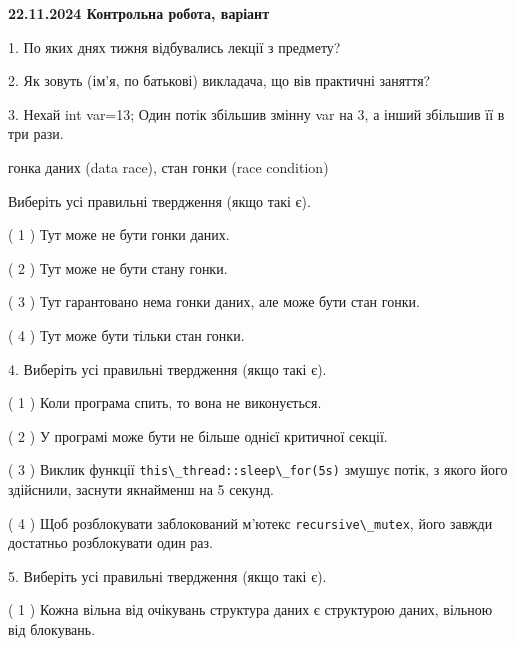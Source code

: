 \documentclass[12pt, ukrainian]{article}
\def\code#1{\Verb!#1!}
\begin{document}
\vspace{4mm}
\newpage
\begin {large}

\textbf{22.11.2024 Контрольна робота, варіант  }\par


{
1. По яких днях тижня відбувались лекції з предмету?



\vspace{5mm}
2. Як зовуть (ім'я, по батькові) викладача, що вів практичні заняття?



\vspace{5mm}
3. Нехай int var=13; Один потік збільшив змінну var на 3, а інший збільшив її в три рази.

гонка даних (data race), стан гонки (race condition)

Виберіть усі правильні твердження (якщо такі є).\par
\vspace{2mm}
( 1 ) Тут може не бути гонки даних.%

( 2 ) Тут може не бути стану гонки.%

( 3 ) Тут гарантовано нема гонки даних, але може бути стан гонки.%

( 4 ) Тут може бути тільки стан гонки.%


\vspace{5mm}
4. Виберіть усі правильні твердження (якщо такі є).\par
\vspace{2mm}

( 1 ) Коли програма спить, то вона не виконується.%

( 2 ) У програмі може бути не більше однієї критичної секції.%

( 3 ) Виклик функції \code{this\_thread::sleep\_for(5s)} змушує потік, з якого його здійснили, заснути якнайменш на 5 секунд.%

( 4 ) Щоб розблокувати заблокований м’ютекс \code{recursive\_mutex}, його завжди достатньо розблокувати один раз.%


\vspace{5mm}
5. Виберіть усі правильні твердження (якщо такі є).\par
\vspace{2mm}

( 1 ) Кожна вільна від очікувань структура даних є структурою даних, вільною від блокувань.%

}
\end{large}
\end{document}
